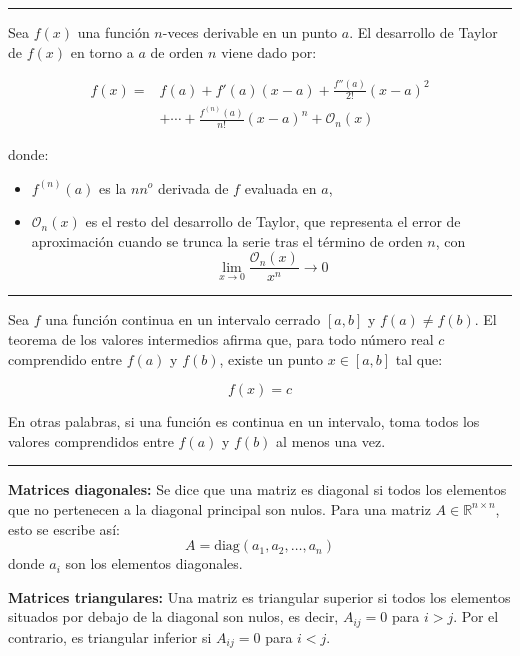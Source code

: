 \hrule
\begin{f}

Sea \( f(x) \) una función \( n \)-veces derivable en un punto \( a \). El desarrollo de Taylor de \( f(x) \) en torno a \( a \) de orden \( n \) viene dado por:

\begin{align*}
	f(x) =& f(a) + f'(a)(x - a) + \frac{f''(a)}{2!}(x - a)^2 \\
	&+ \cdots + \frac{f^{(n)}(a)}{n!}(x - a)^n + \mathcal{O}_n(x)
\end{align*}


donde:
\begin{itemize}
	\item \( f^{(n)}(a) \) es la \( n \)\( n^{o} \) derivada de \( f \) evaluada en \( a \),
	\item \( \mathcal{O}_n(x) \) es el resto del desarrollo de Taylor, que representa el error de aproximación cuando se trunca la serie tras el término de orden \( n \), con 
	\[
	\lim_{x\rightarrow 0}\frac{\mathcal{O}_n(x) }{x^n}\to 0
	\]
\end{itemize}
\end{f}
\hrule
\begin{f} 

Sea \( f \) una función continua en un intervalo cerrado \([a, b]\) y \( f(a) \neq f(b) \). El teorema de los valores intermedios afirma que, para todo número real \( c \) comprendido entre \( f(a) \) y \( f(b) \), existe un punto \( x \in [a, b] \) tal que:

\[
f(x) = c
\]

En otras palabras, si una función es continua en un intervalo, toma todos los valores comprendidos entre \( f(a) \) y \( f(b) \) al menos una vez.
\end{f}
\hrule
\begin{f}
	
	\textbf{Matrices diagonales:}
	Se dice que una matriz es diagonal si todos los elementos que no pertenecen a la diagonal principal son nulos. Para una matriz \( A \in \mathbb{R}^{n \times n} \), esto se escribe así:
	\[
	A = \text{diag}(a_1, a_2, \dots, a_n)
	\]
	donde \( a_i \) son los elementos diagonales.
	
	\textbf{Matrices triangulares:}
	Una matriz es triangular superior si todos los elementos situados por debajo de la diagonal son nulos, es decir, \( A_{ij} = 0 \) para \( i > j \). Por el contrario, es triangular inferior si \( A_{ij} = 0 \) para \( i < j \).
\end{f}
